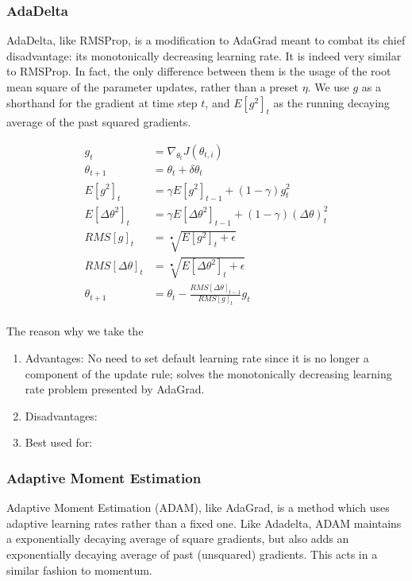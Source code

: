 \documentclass[twoside,11pt]{homework}
\begin{document}
\subsubsection{AdaDelta}
AdaDelta, like RMSProp, is a modification to AdaGrad meant to combat its chief disadvantage: its monotonically decreasing learning  rate. It is indeed very similar to RMSProp. In fact, the only difference between them is the usage of the root mean square of the parameter updates, rather than a preset $\eta$. We use $g$ as a shorthand for the gradient at time step $t$, and $E[g^2]_t$ as the running decaying average of the past squared gradients.

\begin{align*}
	g_t &= \nabla_{\theta_t} J(\theta_{t, i})\\
	\theta_{t+1} &= \theta_t + \delta \theta_t\\
	E[g^2]_t &= \gamma E[g^2]_{t-1} + (1-\gamma)g^2_t \\
	E[\Delta \theta^2]_t &= \gamma E[\Delta \theta^2]_{t-1} + (1-\gamma)(\Delta \theta)^2_t \\
	RMS[g]_t &= \sqrt[•]{E[g^2]_t+\epsilon}\\
	RMS[\Delta \theta]_t &= \sqrt[•]{E[\Delta \theta^2]_t+\epsilon}\\
	\theta_{t+1} &= \theta_t - \frac{RMS[\Delta \theta]_{t-1}}{RMS[g]_t} g_t\\
\end{align*}

The reason why we take the
\begin{enumerate}
	\item Advantages: No need to set default learning rate since it is no longer a component of the update rule; solves the monotonically decreasing learning rate problem presented by AdaGrad.
	\item Disadvantages:
	\item Best used for:
\end{enumerate}
\subsubsection{Adaptive Moment Estimation}

Adaptive Moment Estimation (ADAM), like AdaGrad, is a method which uses adaptive learning rates rather than a fixed one. Like Adadelta, ADAM maintains a exponentially decaying average of square gradients, but also adds an exponentially decaying average of past (unsquared) gradients. This acts in a similar fashion to momentum.
\end{document}
